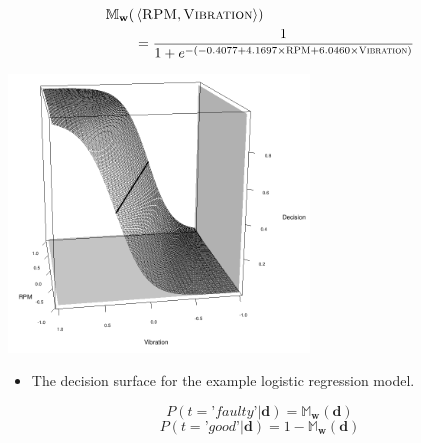 \documentclass[xcolor={table}]{beamer}
\newcommand{\featN}[1]{\textsc{#1}}
\newcommand{\featL}[1]{\textit{'#1'}}
\begin{document}
 \begin{frame} 
 \begin{example}
\begin{alignat*}{2}
		\mathbb{M}_{\mathbf{w}}(&\left< \featN{RPM}, \featN{Vibration} \right>) \notag \\
		& = \frac{1}{1+e^{-(-0.4077 + 4.1697 \times \featN{RPM} + 6.0460 \times \featN{Vibration} )}}
		\label{eqn:faultyMachineryLogisticExample}
\end{alignat*}
\end{example}
\end{frame} 

 \begin{frame} 
\begin{center}
\includegraphics[width=0.6\textwidth]{./images/gradientDescentLogisticClassificationDemoGoodSepLogisticThreshDecisionSurface.png}
\end{center}
 \begin{itemize}
 	\item The decision surface for the example logistic regression model.
\end{itemize}
\end{frame} 

 \begin{frame} 
 \begin{equation*}
 P(t=\featL{faulty} | \mathbf{d}) = \mathbb{M}_{\mathbf{w}}(\mathbf{d})
 \end{equation*}
 \begin{equation*}
P(t=\featL{good} | \mathbf{d}) = 1 - \mathbb{M}_{\mathbf{w}}(\mathbf{d})
 \end{equation*}
\end{frame} 
\end{document}
